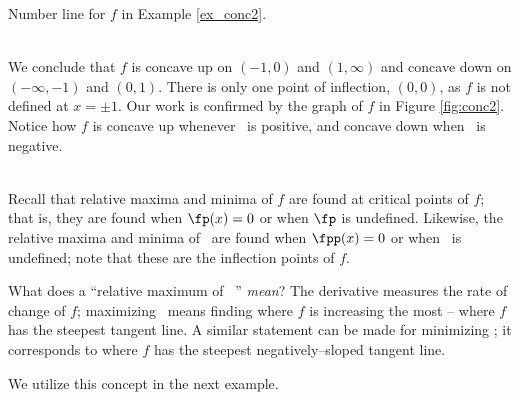 {\noindent\begin{minipage}{\textwidth}\centering
{}
\captionsetup{type=figure}%
\caption{Number line for $f$ in Example \ref{ex_conc2}.}\label{fig:concline2}
\end{minipage}\\

We conclude that $f$ is concave up on $(-1,0)$ and $(1,\infty)$ and concave down on $(-\infty,-1)$ and $(0,1)$. There is only one point of inflection, $(0,0)$, as $f$ is not defined at $x=\pm 1$. Our work is confirmed by the graph of $f$ in Figure \ref{fig:conc2}. Notice how $f$ is concave up whenever \fpp\ is positive, and concave down when \fpp\ is negative.
}\\

Recall that relative maxima and minima of $f$ are found at critical points of $f$; that is, they are found when $\fp(x)=0$ or when $\fp$ is undefined. Likewise, the relative maxima and minima of \fp\ are found when $\fpp(x)=0$ or when \fpp\ is undefined; note that these are the inflection points of $f$. 

What does a ``relative maximum of \fp\ '' \textit{mean}? The derivative measures the rate of change of $f$; maximizing \fp\ means finding  where $f$ is increasing the most -- where $f$ has the steepest tangent line. A similar statement can be made for minimizing \fp; it corresponds to where $f$ has the steepest negatively--sloped tangent line.

We utilize this concept in the next example.\\

\enlargethispage{\baselineskip}

